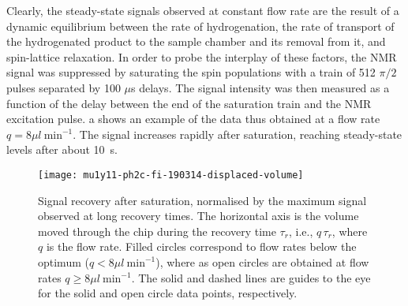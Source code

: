 Clearly, the steady-state signals observed at constant flow rate are the result
of a dynamic equilibrium between the rate of hydrogenation, the rate of
transport of the hydrogenated product to the sample chamber and its removal
from it, and spin-lattice relaxation. In order to probe the interplay of these
factors, the NMR signal was suppressed by saturating the spin populations
with a train of 512 $\pi/2$ pulses separated by 100 $\mu$s delays.
The signal intensity was then measured as a function of the delay between the
end of the saturation train and the NMR excitation pulse.
a shows an example of the data thus obtained at a
flow rate $q=8\mu{l}~\text{min}^{-1}$.
The signal increases rapidly after saturation, reaching
steady-state levels after about 10~s.

\begin{figure}
  \begin{center}
  \texttt{[image: mu1y11-ph2c-fi-190314-displaced-volume]}
  \end{center}
  \caption{Signal recovery after saturation, normalised by the maximum signal
  observed at long recovery times. The horizontal axis is the volume
  moved through the chip during the recovery time $\tau_r$, i.e., $q\,\tau_r$,
  where $q$ is the flow rate. Filled circles correspond to flow rates below
  the optimum ($q<8\mu{l}~\text{min}^{-1}$), where as open circles
  are obtained at flow rates $q\ge 8\mu{l}~\text{min}^{-1}$. The solid
  and dashed lines are guides to the eye for the solid and open circle data points,
  respectively.}
  \label{fig:displaced-volume}
\end{figure}

